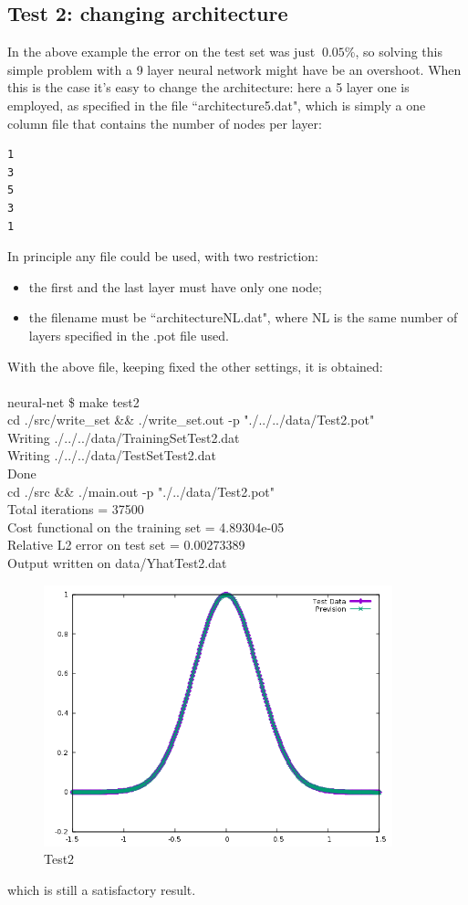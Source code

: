 \documentclass[12pt, a4paper]{report}
\theoremstyle{definition}
\begin{document}
\subsection{Test 2: changing architecture}
In the above example the error on the test set was just $~0.05$\%, so solving this simple problem with a 9 layer neural network might have be an overshoot. When this is the case it's easy to change the architecture: here a 5 layer one is employed, as specified in the file ``architecture5.dat", which is simply a one column file that contains the number of nodes per layer:
\begin{lstlisting}[frame=single]
1
3
5
3
1
\end{lstlisting}
In principle any file could be used, with two restriction:
\begin{itemize}
	\item the first and the last layer must have only one node;
	\item the filename must be ``architectureNL.dat", where NL is the same number of layers specified in the .pot file used.
\end{itemize}
With the above file, keeping fixed the other settings, it is obtained:\\
{\\\ttfamily neural-net \$ make test2\\
cd ./src/write\_set \&\& ./write\_set.out -p "./../../data/Test2.pot"\\
Writing ./../../data/TrainingSetTest2.dat\\
Writing ./../../data/TestSetTest2.dat\\
Done\\
cd ./src \&\& ./main.out -p "./../data/Test2.pot"\\
Total iterations = 37500\\
Cost functional on the training set = 4.89304e-05\\
Relative L2 error on test set = 0.00273389\\
Output written on data/YhatTest2.dat\\
}
\begin{figure}[H]
	\centering
	\includegraphics[width=0.9\textwidth]{img/Test2} 
	\caption{Test2}
\end{figure}
\noindent which is still a satisfactory result.
\end{document}
